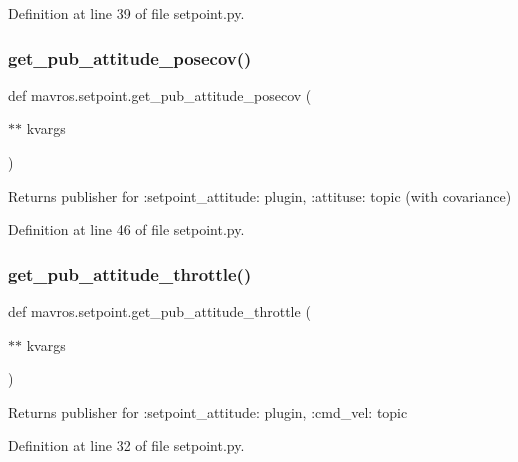 Definition at line 39 of file setpoint.\+py.

\mbox{\label{namespacemavros_1_1setpoint_a276d8b4fb7f05ece98f12736cdff8a97}} 
\subsubsection{\texorpdfstring{get\_pub\_attitude\_posecov()}{get\_pub\_attitude\_posecov()}}
{\footnotesize\ttfamily def mavros.\+setpoint.\+get\+\_\+pub\+\_\+attitude\+\_\+posecov (\begin{DoxyParamCaption}\item[{$\ast$$\ast$}]{kvargs }\end{DoxyParamCaption})}

\begin{DoxyVerb}Returns publisher for :setpoint_attitude: plugin, :attituse: topic (with covariance)
\end{DoxyVerb}
 

Definition at line 46 of file setpoint.\+py.

\mbox{\label{namespacemavros_1_1setpoint_ae3708c3ad1c4a57dfe0f93fe38a16c56}} 
\subsubsection{\texorpdfstring{get\_pub\_attitude\_throttle()}{get\_pub\_attitude\_throttle()}}
{\footnotesize\ttfamily def mavros.\+setpoint.\+get\+\_\+pub\+\_\+attitude\+\_\+throttle (\begin{DoxyParamCaption}\item[{$\ast$$\ast$}]{kvargs }\end{DoxyParamCaption})}

\begin{DoxyVerb}Returns publisher for :setpoint_attitude: plugin, :cmd_vel: topic
\end{DoxyVerb}
 

Definition at line 32 of file setpoint.\+py.

\mbox{\label{namespacemavros_1_1setpoint_a192309cd81a2562d7d418f509f2be04f}} 
